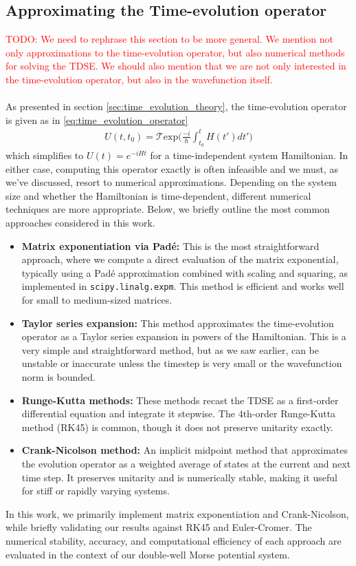 \documentclass{subfiles}
\begin{document}
\subsection{Approximating the Time-evolution operator}
\textcolor{red}{TODO: We need to rephrase this section to be more general. We mention not only approximations to the time-evolution operator, but also numerical methods for solving the TDSE. We should also mention that we are not only interested in the time-evolution operator, but also in the wavefunction itself.} \\\\
As presented in section \ref{sec:time_evolution_theory}, the time-evolution operator is given as in \eqref{eq:time_evolution_operator}
\begin{align*}
    U(t, t_0) = \mathcal{T}\text{exp}\bigg(\frac{-i}{\hbar}\int_{t_0}^t H(t')dt'\bigg)
\end{align*}
which simplifies to $U(t) = e^{-iHt}$ for a time-independent system Hamiltonian. In either case, computing this operator exactly is often infeasible and we must, as we've discussed, resort to numerical approximations. Depending on the system size and whether the Hamiltonian is time-dependent, different numerical techniques are more appropriate. Below, we briefly outline the most common approaches considered in this work.
\begin{itemize}
    \item \textbf{Matrix exponentiation via Padé:} This is the most straightforward approach, where we compute a direct evaluation of the matrix exponential, typically using a Padé approximation combined with scaling and squaring, as implemented in \texttt{scipy.linalg.expm}. This method is efficient and works well for small to medium-sized matrices.
    \item \textbf{Taylor series expansion:} This method approximates the time-evolution operator as a Taylor series expansion in powers of the Hamiltonian. This is a very simple and straightforward method, but as we saw earlier, can be unstable or inaccurate unless the timestep is very small or the wavefunction norm is bounded.
    \item \textbf{Runge-Kutta methods:} These methods recast the TDSE as a first-order differential equation and integrate it stepwise. The 4th-order Runge-Kutta method (RK45) is common, though it does not preserve unitarity exactly.
    \item \textbf{Crank-Nicolson method:} An implicit midpoint method that approximates the evolution operator as a weighted average of states at the current and next time step. It preserves unitarity and is numerically stable, making it useful for stiff or rapidly varying systems.
\end{itemize}
In this work, we primarily implement matrix exponentiation and Crank-Nicolson, while briefly validating our results against RK45 and Euler-Cromer. The numerical stability, accuracy, and computational efficiency of each approach are evaluated in the context of our double-well Morse potential system. \\ \\
\end{document}
